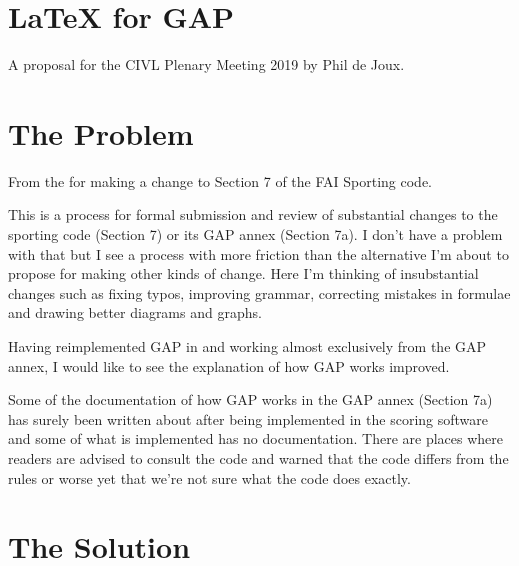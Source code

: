 \documentclass{article}
\begin{document}
\section*{LaTeX for GAP}

A proposal for the CIVL Plenary Meeting 2019 by Phil de Joux.

\section{The Problem}


From the  for making a change to Section 7 of the FAI Sporting code.

This is a process for formal submission and review of substantial changes to
the sporting code (Section 7) or its GAP annex (Section 7a). I don't have
a problem with that but I see a process with more friction than the alternative
I'm about to propose for making other kinds of change. Here I'm thinking of
insubstantial changes such as fixing typos, improving grammar, correcting
mistakes in formulae and drawing better diagrams and graphs.

Having reimplemented GAP in
 and working
almost exclusively from the GAP annex, I would like to see the explanation of
how GAP works improved.

Some of the documentation of how GAP works in the GAP annex (Section 7a) has
surely been written about after being implemented in the scoring software and
some of what is implemented has no documentation.  There are places where
readers are advised to consult the code and warned that the code differs from
the rules or worse yet that we're not sure what the code does exactly.

\section{The Solution}
\end{document}
